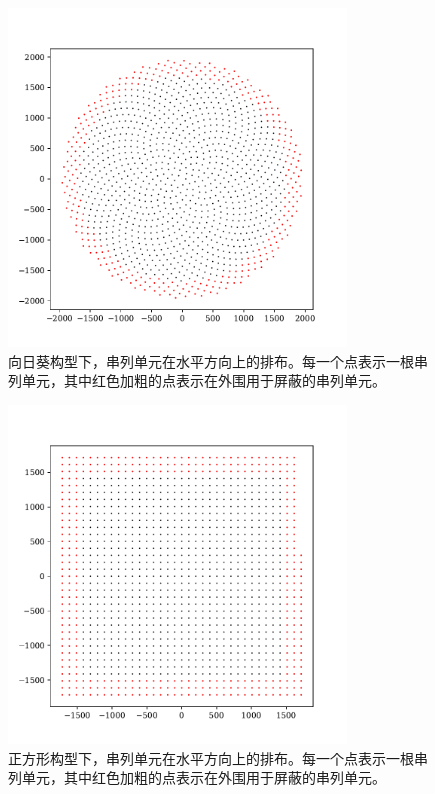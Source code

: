 \begin{figure}[!htb]%
    \centering
    \includegraphics[width=0.80\textwidth]{img/geo_layout_sunflower.pdf}
    \caption{向日葵构型下，串列单元在水平方向上的排布。每一个点表示一根串列单元，其中红色加粗的点表示在外围用于屏蔽的串列单元。}
    \label{fig:geo_layout_sunflower}
\end{figure}

\begin{figure}[!htb]%
    \centering
    \includegraphics[width=0.80\textwidth]{img/geo_layout_cube.pdf}
    \caption{正方形构型下，串列单元在水平方向上的排布。每一个点表示一根串列单元，其中红色加粗的点表示在外围用于屏蔽的串列单元。}
    \label{fig:geo_layout_cube}
\end{figure}

